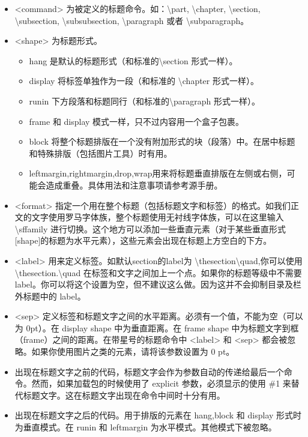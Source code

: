 \documentclass[UTF8,a4paper]{ctexart}
\begin{document}
        \begin{itemize}
            \item <command> 为被定义的标题命令。如：\textbackslash part, \textbackslash chapter, \textbackslash section, \textbackslash subsection, \textbackslash subsubsection, \textbackslash paragraph 或者 \textbackslash subparagraph。
            \item <shape> 为标题形式。
                \begin{itemize}
                    \item  hang 是默认的标题形式（和标准的\textbackslash section 形式一样）。
                    \item display 将标签单独作为一段（和标准的 \textbackslash chapter 形式一样）。
                    \item runin 下方段落和标题同行（和标准的\textbackslash paragraph 形式一样）。
                    \item frame 和 display 模式一样，只不过内容用一个盒子包裹。
                    \item block 将整个标题排版在一个没有附加形式的块（段落）中。在居中标题和特殊排版（包括图片工具）时有用。
                    \item leftmargin,rightmargin,drop,wrap用来将标题垂直排版在左侧或右侧，可能会造成重叠。具体用法和注意事项请参考源手册。
                \end{itemize}
            \item <format> 指定一个用在整个标题（包括标题文字和标签）的格式。如我们正文的文字使用罗马字体族，整个标题使用无衬线字体族，可以在这里输入\textbackslash sffamily 进行切换。这个地方可以添加一些垂直元素（对于某些垂直形式[shape]的标题为水平元素），这些元素会出现在标题上方空白的下方。
            \item <label> 用来定义标签。如默认section的label为 \textbackslash thesection\textbackslash quad,你可以使用 \textbackslash thesection.\textbackslash quad 在标签和文字之间加上一个点。如果你的标题等级中不需要 label。你可以将这个设置为空，但不建议这么做。因为这并不会抑制目录及栏外标题中的 label。
            \item <sep> 定义标签和标题文字之间的水平距离。必须有一个值，不能为空（可以为 0pt）。在 display shape 中为垂直距离。在 frame shape 中为标题文字到框（frame）之间的距离。在带星号的标题命令中 <label> 和 <sep> 都会被忽略。如果你使用图片之类的元素，请将该参数设置为 0 pt。
            \item <before-code> 出现在标题文字之前的代码，标题文字会作为参数自动的传递给最后一个命令。然而，如果加载包的时候使用了 explicit 参数，必须显示的使用 \#1 来替代标题文字。这在标题文字出现在命令中间时十分有用。
            \item <after-code> 出现在标题文字之后的代码。用于排版的元素在 hang,block 和 display 形式时为垂直模式。在 runin 和 leftmargin 为水平模式。其他模式下被忽略。
        \end{itemize}
        
\end{document}
